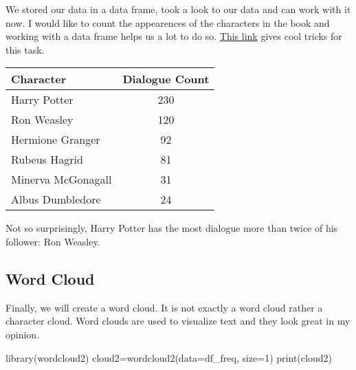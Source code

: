 \documentclass[
  letterpaper,
  DIV=11,
  numbers=noendperiod]{scrreprt}
\newenvironment{Shaded}{\begin{snugshade}}{\end{snugshade}}
\newcommand{\AttributeTok}[1]{\textcolor[rgb]{0.40,0.45,0.13}{#1}}
\newcommand{\ConstantTok}[1]{\textcolor[rgb]{0.56,0.35,0.01}{#1}}
\newcommand{\FunctionTok}[1]{\textcolor[rgb]{0.28,0.35,0.67}{#1}}
\newcommand{\NormalTok}[1]{\textcolor[rgb]{0.00,0.23,0.31}{#1}}
\newcommand{\OtherTok}[1]{\textcolor[rgb]{0.00,0.23,0.31}{#1}}
\newcommand{\SpecialCharTok}[1]{\textcolor[rgb]{0.37,0.37,0.37}{#1}}
\newcommand{\StringTok}[1]{\textcolor[rgb]{0.13,0.47,0.30}{#1}}
\begin{document}
We stored our data in a data frame, took a look to our data and can work
with it now. I would like to count the appearences of the characters in
the book and working with a data frame helps us a lot to do so.
\href{https://www.datasciencemadesimple.com/groupby-count-in-r-2/}{This
link} gives cool tricks for this task.

\begin{Shaded}
\end{Shaded}

\begin{longtable}[]{@{}lc@{}}
\toprule()
Character & Dialogue Count \\
\midrule()
\endhead
Harry Potter & 230 \\
Ron Weasley & 120 \\
Hermione Granger & 92 \\
Rubeus Hagrid & 81 \\
Minerva McGonagall & 31 \\
Albus Dumbledore & 24 \\
\bottomrule()
\end{longtable}

Not so surprisingly, Harry Potter has the most dialogue more than twice
of his follower: Ron Weasley.

\hypertarget{word-cloud}{%
\subsection{Word Cloud}\label{word-cloud}}

Finally, we will create a word cloud. It is not exactly a word cloud
rather a character cloud. Word clouds are used to visualize text and
they look great in my opinion.

\begin{Shaded}
\begin{Highlighting}[]
\NormalTok{library(wordcloud2)}
\NormalTok{cloud2=wordcloud2(data=df\_freq, size=1)}
\NormalTok{print(cloud2)}
\end{Highlighting}
\end{Shaded}
\end{document}
